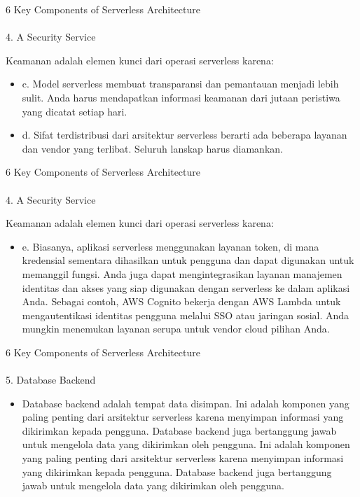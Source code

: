 \documentclass[aspectratio=169, table]{beamer}
\begin{document}
		\begin{frame}{6 Key Components of Serverless Architecture}
			\framesubtitle{\hspace{1cm}}
		4. A Security Service
		
		Keamanan adalah elemen kunci dari operasi serverless karena:
		\begin{itemize}
			\item c. Model serverless membuat transparansi dan pemantauan menjadi lebih sulit. Anda harus mendapatkan informasi keamanan dari jutaan peristiwa yang dicatat setiap hari.
			\item d. Sifat terdistribusi dari arsitektur serverless berarti ada beberapa layanan dan vendor yang terlibat. Seluruh lanskap harus diamankan.
		
		\end{itemize}
	\end{frame}
	
	
	\begin{frame}{6 Key Components of Serverless Architecture}
			\framesubtitle{\hspace{1cm}}
		4. A Security Service
		
		Keamanan adalah elemen kunci dari operasi serverless karena:
		\begin{itemize}
			
			
			\item e. Biasanya, aplikasi serverless menggunakan layanan token, di mana kredensial sementara dihasilkan untuk pengguna dan dapat digunakan untuk memanggil fungsi. Anda juga dapat mengintegrasikan layanan manajemen identitas dan akses yang siap digunakan dengan serverless ke dalam aplikasi Anda. Sebagai contoh, AWS Cognito bekerja dengan AWS Lambda untuk mengautentikasi identitas pengguna melalui SSO atau jaringan sosial. Anda mungkin menemukan layanan serupa untuk vendor cloud pilihan Anda.
		\end{itemize}
	\end{frame}
		
	\begin{frame}{6 Key Components of Serverless Architecture}
			\framesubtitle{\hspace{1cm}}
		5. Database Backend
		\begin{itemize}
			\item Database backend adalah tempat data disimpan. Ini adalah komponen yang paling penting dari arsitektur serverless karena menyimpan informasi yang dikirimkan kepada pengguna. 
			Database backend juga bertanggung jawab untuk mengelola data yang dikirimkan oleh pengguna. 
			Ini adalah komponen yang paling penting dari arsitektur serverless karena menyimpan informasi yang dikirimkan kepada pengguna. 
			Database backend juga bertanggung jawab untuk mengelola data yang dikirimkan oleh pengguna.
		\end{itemize}
	\end{frame}
	
\end{document}
